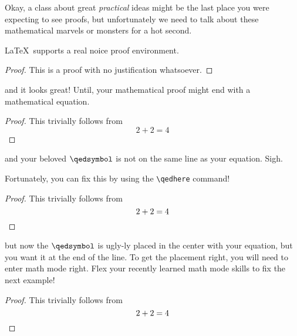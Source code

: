 
Okay, a class about great \textit{practical} ideas might be the last place you were expecting to see proofs, but unfortunately we need to talk about these mathematical marvels or monsters for a hot second.

\LaTeX~supports a real noice proof environment.

\begin{proof}
  This is a proof with no justification whatsoever.
\end{proof}

and it looks great! Until, your mathematical proof might end with a mathematical equation.

\begin{proof}
  This trivially follows from
  $$2 + 2 = 4$$
\end{proof}

and your beloved $\qedsymbol$ is not on the same line as your equation. Sigh.

Fortunately, you can fix this by using the \verb|\qedhere| command!

\begin{proof}
  This trivially follows from
  $$2 + 2 = 4 \qedhere$$
\end{proof}

but now the $\qedsymbol$ is ugly-ly placed in the center with your equation, but you want it at the end of the line. To get the placement right\badpun, you will need to enter math mode right. Flex your recently learned math mode skills to fix the next example!

\begin{proof}
  This trivially follows from
  $$2 + 2 = 4 \qedhere$$
\end{proof}

